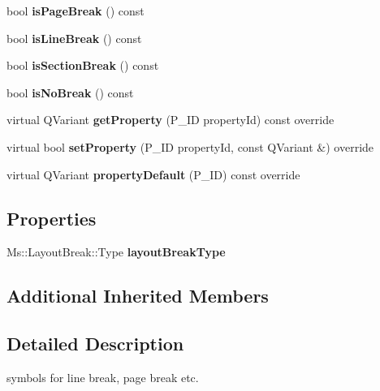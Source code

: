 \begin{DoxyCompactItemize}
bool {\bfseries is\+Page\+Break} () const
\item 
\mbox{\label{class_ms_1_1_layout_break_a5420ee0fd5384e1aca9f8c9e40f69fe1}} 
bool {\bfseries is\+Line\+Break} () const
\item 
\mbox{\label{class_ms_1_1_layout_break_af75db8e95a6659487ec035e3702f8f17}} 
bool {\bfseries is\+Section\+Break} () const
\item 
\mbox{\label{class_ms_1_1_layout_break_ab83046889d2fcc879f657b1e0f8bcd52}} 
bool {\bfseries is\+No\+Break} () const
\item 
\mbox{\label{class_ms_1_1_layout_break_a681b75f84912543b7f339cec41af39e5}} 
virtual Q\+Variant {\bfseries get\+Property} (P\+\_\+\+ID property\+Id) const override
\item 
\mbox{\label{class_ms_1_1_layout_break_aeedf283f43ff5c23906d7826b180d462}} 
virtual bool {\bfseries set\+Property} (P\+\_\+\+ID property\+Id, const Q\+Variant \&) override
\item 
\mbox{\label{class_ms_1_1_layout_break_aa32b39da01b11ac46e522a9c17e58cc0}} 
virtual Q\+Variant {\bfseries property\+Default} (P\+\_\+\+ID) const override
\end{DoxyCompactItemize}
\subsection*{Properties}
\begin{DoxyCompactItemize}
\item 
\mbox{\label{class_ms_1_1_layout_break_a4c93b142c567c41891d93280517198c6}} 
Ms\+::\+Layout\+Break\+::\+Type {\bfseries layout\+Break\+Type}
\end{DoxyCompactItemize}
\subsection*{Additional Inherited Members}


\subsection{Detailed Description}
symbols for line break, page break etc. 

